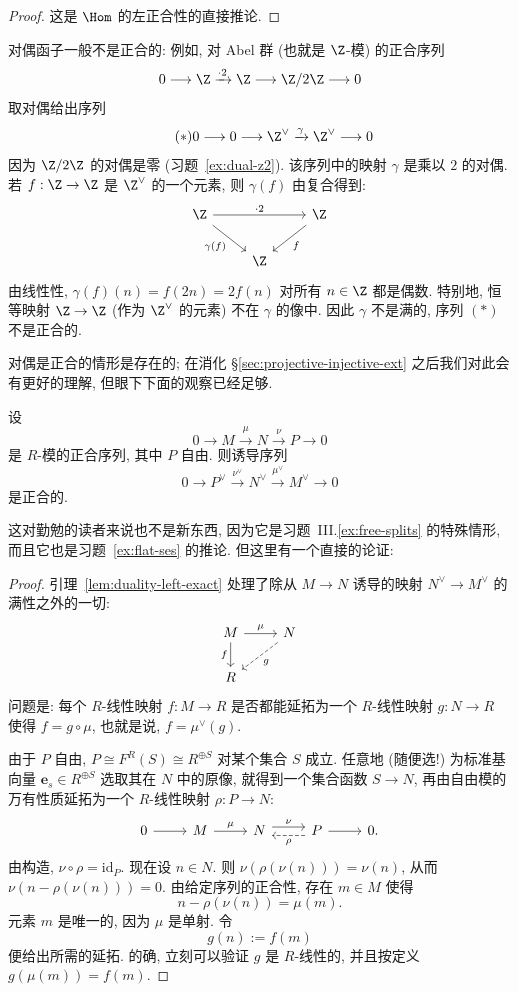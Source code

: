 \begin{proof}
这是 $\Hom$ 的左正合性的直接推论.
\end{proof}

对偶函子一般不是正合的: 例如, 对 Abel 群 (也就是 $\Z$-模) 的正合序列
\[
0\longrightarrow\Z\xrightarrow{\cdot 2}\Z\longrightarrow\Z/2\Z\longrightarrow 0
\]
取对偶给出序列
\begin{equation*}\tag{$*$}
0\longrightarrow 0\longrightarrow\Z^\vee\xrightarrow{\gamma}\Z^\vee\longrightarrow 0
\end{equation*}
因为 $\Z/2\Z$ 的对偶是零 (习题~\ref{ex:dual-z2}). 该序列中的映射 $\gamma$ 是乘以 $2$ 的对偶. 若 $f:\Z\to\Z$ 是 $\Z^\vee$ 的一个元素, 则 $\gamma(f)$ 由复合得到:
\[
\begin{tikzcd}
\Z \ar[rr,"\cdot 2"] \ar[dr,"\gamma(f)"'] & & \Z \ar[dl,"f"] \\
& \Z &
\end{tikzcd}
\]
由线性性, $\gamma(f)(n)=f(2n)=2f(n)$ 对所有 $n\in\Z$ 都是偶数. 特别地, 恒等映射 $\Z\to\Z$ (作为 $\Z^\vee$ 的元素) 不在 $\gamma$ 的像中. 因此 $\gamma$ 不是满的, 序列 $(*)$ 不是正合的.

对偶是正合的情形是存在的; 在消化 \S\ref{sec:projective-injective-ext} 之后我们对此会有更好的理解, 但眼下下面的观察已经足够.

\begin{proposition}\label{prop:dual-free-exact}
设
\[
0\longrightarrow M\xrightarrow{\mu} N\xrightarrow{\nu} P\longrightarrow 0
\]
是 $R$-模的正合序列, 其中 $P$ 自由. 则诱导序列
\[
0\longrightarrow P^\vee\xrightarrow{\nu^\vee} N^\vee\xrightarrow{\mu^\vee} M^\vee\longrightarrow 0
\]
是正合的.
\end{proposition}

这对勤勉的读者来说也不是新东西, 因为它是习题~III.\ref{ex:free-splits} 的特殊情形, 而且它也是习题~\ref{ex:flat-ses} 的推论. 但这里有一个直接的论证:

\begin{proof}
引理~\ref{lem:duality-left-exact} 处理了除从 $M\to N$ 诱导的映射 $N^\vee\to M^\vee$ 的满性之外的一切:
\[
\begin{tikzcd}
M \ar[r,"\mu"] \ar[d,"f"'] & N \ar[ld,dashed,"g"] \\
R
\end{tikzcd}
\]
问题是: 每个 $R$-线性映射 $f:M\to R$ 是否都能延拓为一个 $R$-线性映射 $g:N\to R$ 使得 $f=g\circ\mu$, 也就是说, $f=\mu^\vee(g)$.

由于 $P$ 自由, $P\cong F^R(S)\cong R^{\oplus S}$ 对某个集合 $S$ 成立. 任意地 (随便选!) 为标准基向量 $\mathbf{e}_s\in R^{\oplus S}$ 选取其在 $N$ 中的原像, 就得到一个集合函数 $S\to N$, 再由自由模的万有性质延拓为一个 $R$-线性映射 $\rho:P\to N$:
\[
\begin{tikzcd}
0 \ar[r] & M \ar[r,"\mu"] & N \ar[r,shift left=.7ex,"\nu"] & P \ar[l,shift left=.7ex,dashed,"\rho"] \ar[r] & 0.
\end{tikzcd}
\]
由构造, $\nu\circ\rho=\mathrm{id}_P$. 现在设 $n\in N$. 则 $\nu(\rho(\nu(n)))=\nu(n)$, 从而 $\nu(n-\rho(\nu(n)))=0$. 由给定序列的正合性, 存在 $m\in M$ 使得
\[
n-\rho(\nu(n))=\mu(m).
\]
元素 $m$ 是唯一的, 因为 $\mu$ 是单射. 令
\[
g(n):=f(m)
\]
便给出所需的延拓. 的确, 立刻可以验证 $g$ 是 $R$-线性的, 并且按定义 $g(\mu(m))=f(m)$.
\end{proof}

